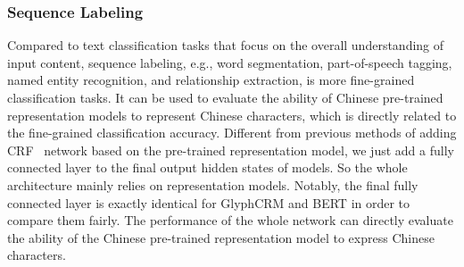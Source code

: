 \subsubsection{Sequence Labeling} Compared to text classification tasks that focus on the overall understanding of input content, sequence labeling, e.g., word segmentation, part-of-speech tagging, named entity recognition, and relationship extraction, is more fine-grained classification tasks. It can be used to evaluate the ability of Chinese pre-trained representation models to represent Chinese characters, which is directly related to the fine-grained classification accuracy. Different from previous methods of adding CRF~\cite{laffertyCrf} network based on the pre-trained representation model, we just add a fully connected layer to the final output hidden states of models. So the whole architecture mainly relies on representation models. Notably, the final fully connected layer is exactly identical for GlyphCRM and BERT in order to compare them fairly. The performance of the whole network can directly evaluate the ability of the Chinese pre-trained representation model to express Chinese characters.
